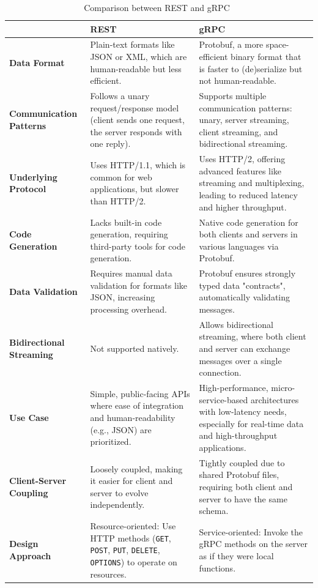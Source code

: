 \begin{table}[htpb]
\centering
\begin{tabular}{|p{3.1cm}|p{5.1cm}|p{5.1cm}|}
\hline
\textbf{} & \textbf{\ac{REST}} & \textbf{\ac{gRPC}} \\
\hline
\textbf{Data Format} & 
Plain-text formats like JSON or XML, which are human-readable but less efficient. & 
\noindent \ac{Protobuf}, a more space-efficient binary format that is faster to (de)serialize but not human-readable. \\
\hline
\textbf{Communication Patterns} & 
Follows a unary request/response model (client sends one request, the server responds with one reply). & 
Supports multiple communication patterns: unary, server streaming, client streaming, and bidirectional streaming. \\
\hline
\textbf{Underlying Protocol} & 
Uses HTTP/1.1, which is common for web applications, but slower than HTTP/2. & 
Uses HTTP/2, offering advanced features like streaming and multiplexing, leading to reduced latency and higher throughput. \\
\hline
\textbf{Code Generation} & 
Lacks built-in code generation, requiring third-party tools for code generation. & 
Native code generation for both clients and servers in various languages via \ac{Protobuf}. \\
\hline
\textbf{Data Validation} & 
Requires manual data validation for formats like JSON, increasing processing overhead. & 
\ac{Protobuf} ensures strongly typed data "contracts", automatically validating messages. \\
\hline
\textbf{Bidirectional Streaming} & 
Not supported natively. & 
Allows bidirectional streaming, where both client and server can exchange messages over a single connection. \\
\hline
\textbf{Use Case} & 
Simple, public-facing \ac{API}s where ease of integration and human-readability (e.g., JSON) are prioritized. & 
High-performance, micro-service-based architectures with low-latency needs, especially for real-time data and high-throughput applications. \\
\hline
\textbf{Client-Server Coupling} & 
Loosely coupled, making it easier for client and server to evolve independently. & 
Tightly coupled due to shared \ac{Protobuf} files, requiring both client and server to have the same schema. \\
\hline
\textbf{Design Approach} & 
Resource-oriented: Use HTTP methods (\texttt{GET}, \texttt{POST}, \texttt{PUT}, \texttt{DELETE}, \texttt{OPTIONS}) to operate on resources. & 
Service-oriented: Invoke the \ac{gRPC} methods on the server as if they were local functions. \\
\hline
\end{tabular}
\caption{Comparison between \ac{REST} and \ac{gRPC}~\parencite{grpc_vs_rest, grpc_vs_rest_2, grpc_vs_rest_3, grpc_vs_rest_4}}
\label{table:rest_vs_grpc}
\end{table}

